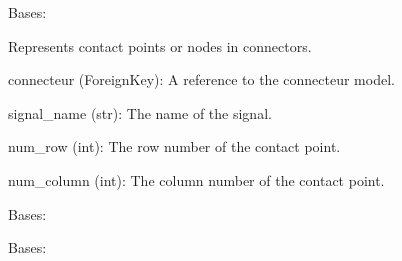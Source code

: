 \documentclass[letterpaper,10pt,english]{sphinxmanual}
\begin{document}
\begin{fulllineitems}
\label{\detokenize{app:app.models.contacts}}
\pysigstartsignatures
{}
\pysigstopsignatures
\sphinxAtStartPar
Bases: 

\sphinxAtStartPar
Represents contact points or nodes in connectors.
\begin{description}
\sphinxAtStartPar
connecteur (ForeignKey): A reference to the connecteur model.

\sphinxAtStartPar
signal\_name (str): The name of the signal.

\sphinxAtStartPar
num\_row (int): The row number of the contact point.

\sphinxAtStartPar
num\_column (int): The column number of the contact point.

\end{description}

\begin{fulllineitems}
\label{\detokenize{app:app.models.contacts.DoesNotExist}}
\pysigstartsignatures
{}
\pysigstopsignatures
\sphinxAtStartPar
Bases: 

\end{fulllineitems}


\begin{fulllineitems}
\label{\detokenize{app:app.models.contacts.MultipleObjectsReturned}}
\pysigstartsignatures
{}
\pysigstopsignatures
\sphinxAtStartPar
Bases: 

\end{fulllineitems}



\end{fulllineitems}
\end{document}
